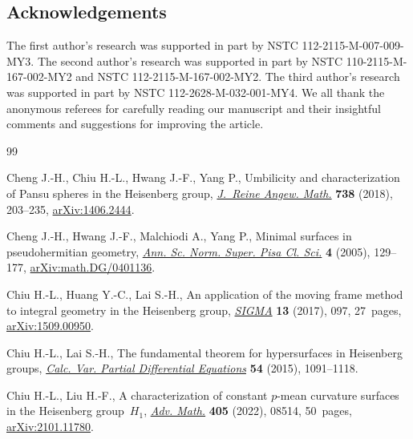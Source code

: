 \documentclass[pdftex]{sigma}
\numberwithin{equation}{section}
\begin{document}
\subsection*{Acknowledgements}

The first author's research was supported in part by NSTC 112-2115-M-007-009-MY3. The second author's research was supported in part by NSTC 110-2115-M-167-002-MY2 and NSTC 112-2115-M-167-002-MY2. The third author's research was supported in part by NSTC 112-2628-M-032-001-MY4. We all thank the anonymous referees for carefully reading our manuscript and their insightful comments and suggestions for improving the article.

\begin{thebibliography}{99}
\footnotesize\itemsep=0pt

Cheng J.-H., Chiu H.-L., Hwang J.-F., Yang P., Umbilicity and characterization of
 {P}ansu spheres in the {H}eisenberg group, \href{https://doi.org/10.1515/crelle-2015-0044}{\textit{J.~Reine Angew. Math.}}
 \textbf{738} (2018), 203--235, \href{https://arxiv.org/abs/1406.2444}{arXiv:1406.2444}.

Cheng J.-H., Hwang J.-F., Malchiodi A., Yang P., Minimal surfaces in
 pseudohermitian geometry, \href{http://www.numdam.org/item/ASNSP_2005_5_4_1_129_0/}{\textit{Ann. Sc. Norm. Super. Pisa Cl. Sci.}}
 \textbf{4} (2005), 129--177, \href{https://arxiv.org/abs/math.DG/0401136}{arXiv:math.DG/0401136}.

Chiu H.-L., Huang Y.-C., Lai S.-H., An application of the moving frame method to
 integral geometry in the {H}eisenberg group, \href{https://doi.org/10.3842/SIGMA.2017.097}{\textit{SIGMA}} \textbf{13}
 (2017), 097, 27~pages, \href{https://arxiv.org/abs/1509.00950}{arXiv:1509.00950}.

Chiu H.-L., Lai S.-H., The fundamental theorem for hypersurfaces in {H}eisenberg
 groups, \href{https://doi.org/10.1007/s00526-015-0818-1}{\textit{Calc. Var. Partial Differential Equations}} \textbf{54}
 (2015), 1091--1118.

Chiu H.-L., Liu H.-F., A characterization of constant {$p$}-mean curvature
 surfaces in the {H}eisenberg group~{$H_1$}, \href{https://doi.org/10.1016/j.aim.2022.108514}{\textit{Adv. Math.}} \textbf{405}
 (2022), 08514, 50~pages, \href{https://arxiv.org/abs/2101.11780}{arXiv:2101.11780}.


\end{thebibliography}
\end{document}
